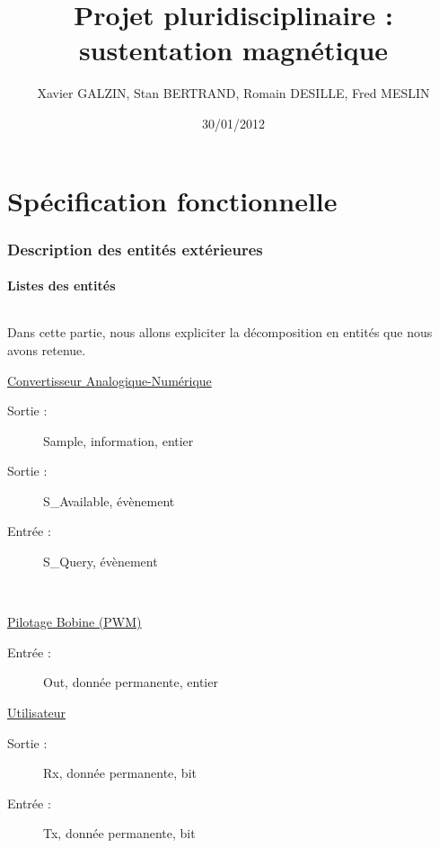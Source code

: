 \documentclass[11pt, french]{article} %
\title{Projet pluridisciplinaire : sustentation magnétique}
\author{ Xavier GALZIN, Stan BERTRAND, Romain DESILLE, Fred MESLIN}
\date{30/01/2012}
\begin{document}
\maketitle
\pagebreak


\part{Spécification fonctionnelle}

\section{Description des entités extérieures}

\subsection{Listes des entités}

\paragraph{} Dans cette partie, nous allons expliciter la décomposition en entités que nous avons retenue.
\vspace{0.2in}

\begin{minipage}[t]{10cm}
\hspace{0.2in}
\underline{Convertisseur Analogique-Numérique}
\begin{description}
\item[Sortie :] Sample, information, entier
\item[Sortie :] S\_Available, évènement
\item[Entrée :] S\_Query, évènement
\end{description}


\end{minipage}
~
\begin{minipage}[t]{10cm}
\hspace{0.2in}
\underline{Pilotage Bobine (PWM)}
\begin{description}
\item[Entrée : ] Out, donnée permanente, entier
\end{description}


\end{minipage}

\begin{minipage}[h]{20cm}
\hspace{0.2in}
\hspace{0.2in}
\underline{Utilisateur}   
\begin{description}
\item[Sortie : ] Rx, donnée permanente, bit
\item[Entrée : ] Tx, donnée permanente, bit
\end{description}


\end{minipage}
\end{document}
